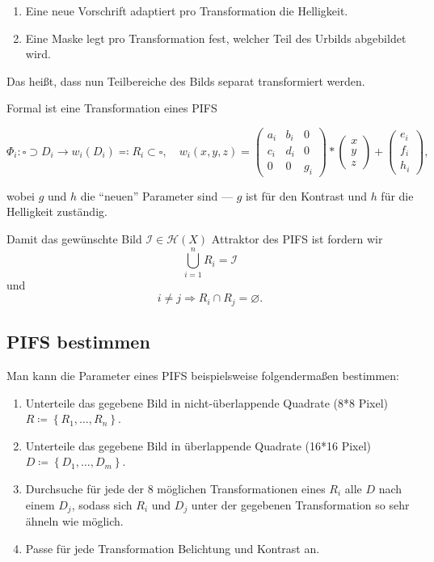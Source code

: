\documentclass[afourpaper]{latex-classes/handout}
\begin{document}
\begin{enumerate}
  \item Eine neue Vorschrift adaptiert pro Transformation die Helligkeit.
  \item Eine Maske legt pro Transformation fest, welcher Teil des Urbilds abgebildet wird.
\end{enumerate}

Das heißt, dass nun Teilbereiche des Bilds separat transformiert werden.

Formal ist eine Transformation eines PIFS

\begin{equation*}
  \Phi_i: \square \supset D_i \to w_i(D_i) \eqqcolon R_i \subset \square, \quad w_i(x,y,z) = \begin{pmatrix}
    a_i & b_i & 0 \\
    c_i & d_i & 0 \\
    0 & 0 & g_i
  \end{pmatrix} * \begin{pmatrix}
    x \\ y \\ z
  \end{pmatrix} + \begin{pmatrix}
    e_i \\ f_i \\ h_i
  \end{pmatrix}\text{,}
\end{equation*}

wobei \( g \) und \( h \) die ``neuen'' Parameter sind --- \( g \) ist für den Kontrast und \( h \) für die Helligkeit zuständig.

Damit das gewünschte Bild \( \mathcal{I} \in \mathcal{H}(X) \) Attraktor des PIFS ist fordern wir
\begin{equation*}
  \bigcup_{i=1}^n R_i = \mathcal{I}
\end{equation*}
und
\begin{equation*}
  i \neq j \Rightarrow R_i \cap R_j = \varnothing\text{.}
\end{equation*}

\subsection{PIFS bestimmen}

Man kann die Parameter eines PIFS beispielsweise folgendermaßen bestimmen:

\begin{enumerate}
  \item Unterteile das gegebene Bild in nicht-überlappende Quadrate (8*8 Pixel) \( R \coloneqq \left \{ R_1,\dots, R_n \right \} \).
  \item Unterteile das gegebene Bild in überlappende Quadrate (16*16 Pixel) \( D \coloneqq \left \{ D_1, \dots, D_m \right \} \).
  \item Durchsuche für jede der 8 möglichen Transformationen eines \( R_i \) alle \( D \) nach einem \( D_j \), sodass sich \( R_i \) und \( D_j \) unter der gegebenen Transformation so sehr ähneln wie möglich.
  \item Passe für jede Transformation Belichtung und Kontrast an.
\end{enumerate}
\end{document}
